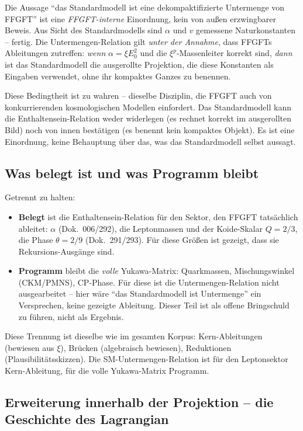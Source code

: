 \medskip
Die Aussage \enquote{das Standardmodell ist eine dekompaktifizierte
Untermenge von FFGFT} ist eine \emph{FFGFT-interne} Einordnung, kein von
außen erzwingbarer Beweis. Aus Sicht des Standardmodells sind $\alpha$ und
$v$ gemessene Naturkonstanten -- fertig. Die Untermengen-Relation gilt
\emph{unter der Annahme}, dass FFGFTs Ableitungen zutreffen: \emph{wenn}
$\alpha = \xi E_0^2$ und die $\xi^p$-Massenleiter korrekt sind, \emph{dann}
ist das Standardmodell die ausgerollte Projektion, die diese Konstanten als
Eingaben verwendet, ohne ihr kompaktes Ganzes zu benennen.

Diese Bedingtheit ist zu wahren -- dieselbe Disziplin, die FFGFT auch von
konkurrierenden kosmologischen Modellen einfordert. Das Standardmodell kann
die Enthaltensein-Relation weder widerlegen (es rechnet korrekt im
ausgerollten Bild) noch von innen bestätigen (es benennt kein kompaktes
Objekt). Es ist eine Einordnung, keine Behauptung über das, was das
Standardmodell selbst aussagt.

\subsection*{Was belegt ist und was Programm bleibt}

Getrennt zu halten:

\begin{itemize}
  \item \textbf{Belegt} ist die Enthaltensein-Relation für den Sektor, den
    FFGFT tatsächlich ableitet: $\alpha$ (Dok.~006/292), die Leptonmassen und
    der Koide-Skalar $Q = 2/3$, die Phase $\theta = 2/9$ (Dok.~291/293). Für
    diese Größen ist gezeigt, dass sie Rekursions-Ausgänge sind.
  \item \textbf{Programm} bleibt die \emph{volle} Yukawa-Matrix: Quarkmassen,
    Mischungswinkel (CKM/PMNS), CP-Phase. Für diese ist die
    Untermengen-Relation nicht ausgearbeitet -- hier wäre \enquote{das
    Standardmodell ist Untermenge} ein Versprechen, keine gezeigte Ableitung.
    Dieser Teil ist als offene Bringschuld zu führen, nicht als Ergebnis.
\end{itemize}

Diese Trennung ist dieselbe wie im gesamten Korpus: Kern-Ableitungen (bewiesen
aus $\xi$), Brücken (algebraisch bewiesen), Reduktionen
(Plausibilitätsskizzen). Die SM-Untermengen-Relation ist für den Leptonsektor
Kern-Ableitung, für die volle Yukawa-Matrix Programm.

\subsection*{Erweiterung innerhalb der Projektion -- die Geschichte des Lagrangian}

